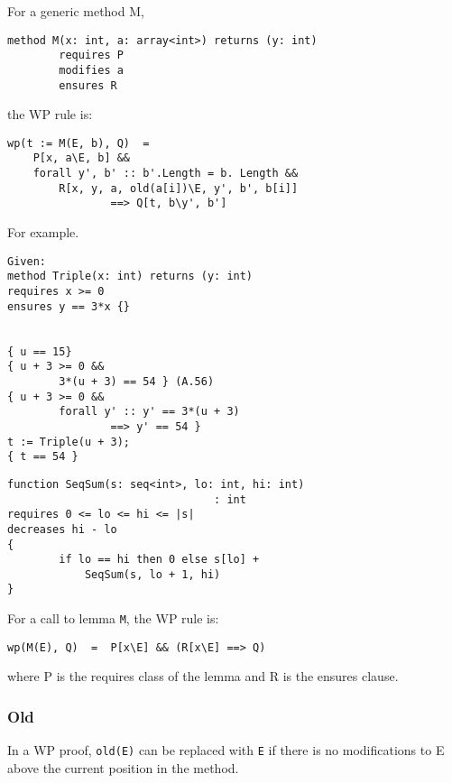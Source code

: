 For a generic method M,
\begin{verbatim}
method M(x: int, a: array<int>) returns (y: int) 
        requires P
        modifies a
        ensures R
\end{verbatim}
the WP rule is:
\begin{verbatim}
wp(t := M(E, b), Q)  =  
    P[x, a\E, b] && 
    forall y', b' :: b'.Length = b. Length &&
        R[x, y, a, old(a[i])\E, y', b', b[i]] 
                ==> Q[t, b\y', b']
\end{verbatim}
For example.
\begin{verbatim}
Given:
method Triple(x: int) returns (y: int)
requires x >= 0
ensures y == 3*x {}


{ u == 15}
{ u + 3 >= 0 &&
        3*(u + 3) == 54 } (A.56)
{ u + 3 >= 0 &&
        forall y' :: y' == 3*(u + 3)
                ==> y' == 54 }
t := Triple(u + 3);
{ t == 54 }

\end{verbatim}
\begin{verbatim}
function SeqSum(s: seq<int>, lo: int, hi: int)
                                : int
requires 0 <= lo <= hi <= |s|
decreases hi - lo
{
        if lo == hi then 0 else s[lo] +
            SeqSum(s, lo + 1, hi)
}
\end{verbatim}

For a call to lemma \verb!M!, the WP rule is:
\begin{verbatim}
wp(M(E), Q)  =  P[x\E] && (R[x\E] ==> Q)
\end{verbatim}
where P is the requires class of the lemma and R is the ensures clause.

\subsubsection{Old}
In a WP proof, \verb!old(E)! can be replaced with \verb!E! 
if there is no modifications to E above the current position in the method.